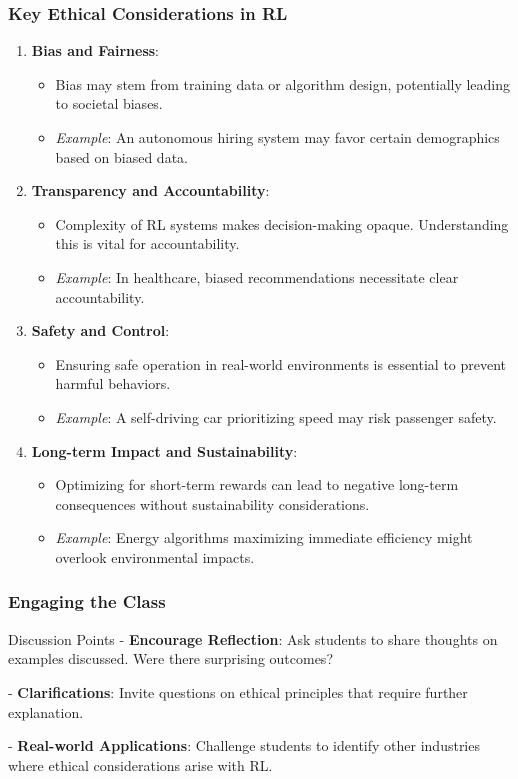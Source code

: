\documentclass[aspectratio=169]{beamer}
\begin{document}
\begin{frame}[fragile]
    \frametitle{Key Ethical Considerations in RL}
    \begin{enumerate}
        \item \textbf{Bias and Fairness}:
        \begin{itemize}
            \item Bias may stem from training data or algorithm design, potentially leading to societal biases.
            \item \textit{Example}: An autonomous hiring system may favor certain demographics based on biased data.
        \end{itemize}
        
        \item \textbf{Transparency and Accountability}:
        \begin{itemize}
            \item Complexity of RL systems makes decision-making opaque. Understanding this is vital for accountability.
            \item \textit{Example}: In healthcare, biased recommendations necessitate clear accountability.
        \end{itemize}
        
        \item \textbf{Safety and Control}:
        \begin{itemize}
            \item Ensuring safe operation in real-world environments is essential to prevent harmful behaviors.
            \item \textit{Example}: A self-driving car prioritizing speed may risk passenger safety.
        \end{itemize}
        
        \item \textbf{Long-term Impact and Sustainability}:
        \begin{itemize}
            \item Optimizing for short-term rewards can lead to negative long-term consequences without sustainability considerations.
            \item \textit{Example}: Energy algorithms maximizing immediate efficiency might overlook environmental impacts.
        \end{itemize}
    \end{enumerate}
\end{frame}

\begin{frame}[fragile]
    \frametitle{Engaging the Class}
    \begin{block}{Discussion Points}
        - \textbf{Encourage Reflection}: Ask students to share thoughts on examples discussed. Were there surprising outcomes?
        
        - \textbf{Clarifications}: Invite questions on ethical principles that require further explanation.
        
        - \textbf{Real-world Applications}: Challenge students to identify other industries where ethical considerations arise with RL.
    \end{block}
\end{frame}
\end{document}
